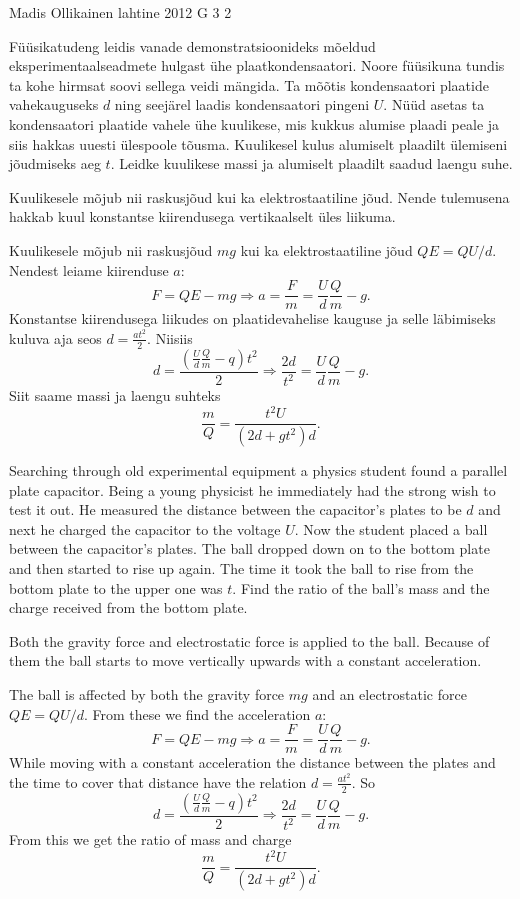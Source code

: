 {Madis Ollikainen} %
{lahtine} %
{2012} %
{G 3} %
{2} %
{
\ifStatement
Füüsikatudeng leidis vanade demonstratsioonideks mõeldud eksperimentaalseadmete
hulgast ühe plaatkondensaatori. Noore füüsikuna tundis ta kohe hirmsat soovi
sellega veidi mängida. Ta mõõtis kondensaatori plaatide vahekauguseks $d$
ning seejärel laadis kondensaatori pingeni $U$. Nüüd asetas ta
kondensaatori plaatide vahele ühe kuulikese, mis kukkus alumise plaadi peale
ja siis hakkas uuesti ülespoole tõusma. Kuulikesel kulus alumiselt plaadilt
ülemiseni jõudmiseks aeg $t$. Leidke kuulikese massi ja alumiselt plaadilt
saadud laengu suhe.
\fi


\ifHint
Kuulikesele mõjub nii raskusjõud kui ka elektrostaatiline jõud. Nende tulemusena hakkab kuul konstantse kiirendusega vertikaalselt üles liikuma.
\fi


\ifSolution
Kuulikesele mõjub nii raskusjõud $mg$ kui ka elektrostaatiline jõud $QE=QU/d$. Nendest leiame kiirenduse $a$:
\[ F = QE - mg \Rightarrow a = \frac{F}{m} = \frac{U}{d}\frac{Q}{m} - g. \]
Konstantse kiirendusega liikudes on plaatidevahelise kauguse ja selle läbimiseks kuluva aja seos $ d = \frac{at^2}{2} $. Niisiis
\[ d = \frac{\left(\frac{U}{d}\frac{Q}{m} - q\right)t^2}{2} \Rightarrow \frac{2d}{t^2} = \frac{U}{d}\frac{Q}{m} - g. \]
Siit saame massi ja laengu suhteks
\[ \frac{m}{Q} = \frac{t^2U}{\left(2d + gt^2\right)d}.  \]
\fi


\ifEngStatement
Searching through old experimental equipment a physics student found a parallel plate capacitor. Being a young physicist he immediately had the strong wish to test it out. He measured the distance between the capacitor’s plates to be $d$ and next he charged the capacitor to the voltage $U$. Now the student placed a ball between the capacitor’s plates. The ball dropped down on to the bottom plate and then started to rise up again. The time it took the ball to rise from the bottom plate to the upper one was $t$. Find the ratio of the ball’s mass and the charge received from the bottom plate.
\fi


\ifEngHint
Both the gravity force and electrostatic force is applied to the ball. Because of them the ball starts to move vertically upwards with a constant acceleration.
\fi


\ifEngSolution
The ball is affected by both the gravity force $mg$ and an electrostatic force $QE=QU/d$. From these we find the acceleration $a$:
\[ F = QE - mg \Rightarrow a = \frac{F}{m} = \frac{U}{d}\frac{Q}{m} - g. \]
While moving with a constant acceleration the distance between the plates and the time to cover that distance have the relation $ d = \frac{at^2}{2} $. So
\[ d = \frac{\left(\frac{U}{d}\frac{Q}{m} - q\right)t^2}{2} \Rightarrow \frac{2d}{t^2} = \frac{U}{d}\frac{Q}{m} - g. \] 
From this we get the ratio of mass and charge
\[ \frac{m}{Q} = \frac{t^2U}{\left(2d + gt^2\right)d}.  \]
\fi
}